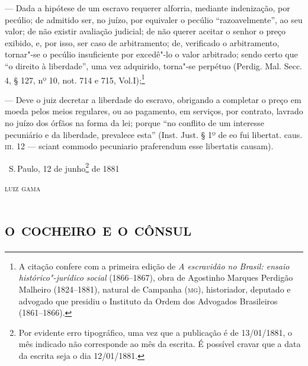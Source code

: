 --- Dada a hipótese de um escravo requerer alforria, mediante
indenização, por pecúlio; de admitido ser, no juízo, por equivaler o
pecúlio ``razoavelmente'', ao seu valor; de não existir avaliação
judicial; de não querer aceitar o senhor o preço exibido, e, por isso,
ser caso de arbitramento; de, verificado o arbitramento, tornar"-se o
pecúlio insuficiente por excedê"-lo o valor arbitrado; sendo certo que ``o
direito à liberdade'', uma vez adquirido, torna"-se perpétuo (Perdig. Mal.
Secc. 4, § 127, nº 10, not. 714 e 715, Vol.I);\footnote{A citação
  confere com a primeira edição de \emph{A escravidão no Brasil: ensaio
  histórico"-jurídico social} (1866--1867), obra de Agostinho Marques
  Perdigão Malheiro (1824--1881), natural de Campanha (\textsc{mg}), historiador,
  deputado e advogado que presidiu o Instituto da Ordem dos Advogados
  Brasileiros (1861--1866).}

--- Deve o juiz decretar a liberdade do escravo, obrigando a completar
o preço em moeda pelos meios regulares, ou ao pagamento, em serviços,
por contrato, lavrado no juízo dos órfãos na forma da lei; porque ``no
conflito de um interesse pecuniário e da liberdade, prevalece esta''
(Inst. Just. § 1º de eo fui libertat. caus. \textsc{iii}. 12 --- sciant commodo
pecuniario praferendum esse libertatis causam).

\bigskip

\hfill\ S.\,Paulo, 12 de junho\footnote{Por evidente erro tipográfico, uma
    vez que a publicação é de 13/01/1881, o mês indicado não corresponde
    ao mês da escrita. É possível cravar que a data da escrita seja o
    dia 12/01/1881.} de 1881\smallskip

\hfill\textsc{luiz gama}

\begingroup\makeatletter\@openrightfalse
\part{\textsc{o cocheiro e o cônsul}}

\pagebreak
\mbox{}\vfill
\thispagestyle{empty}

